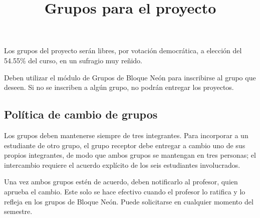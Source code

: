 \documentclass{doc}
\title{Grupos para el proyecto}
\begin{document}
\makedocheader

Los grupos del proyecto serán libres, por votación democrática, a elección del 54.55\% del curso, en un sufragio muy reñido.

Deben utilizar el módulo de Grupos de Bloque Neón para inscribirse al grupo que deseen. Si no se inscriben a algún grupo, no podrán entregar los proyectos.

\subsection{Política de cambio de grupos}
Los grupos deben mantenerse siempre de tres integrantes. Para incorporar a un estudiante de otro grupo, el grupo receptor debe entregar a cambio uno de sus propios integrantes, de modo que ambos grupos se mantengan en tres personas; el intercambio requiere el acuerdo explícito de los seis estudiantes involucrados.

Una vez ambos grupos estén de acuerdo, deben notificarlo al profesor, quien aprueba el cambio. Este solo se hace efectivo cuando el profesor lo ratifica y lo refleja en los grupos de Bloque Neón. Puede solicitarse en cualquier momento del semestre.
\end{document}
